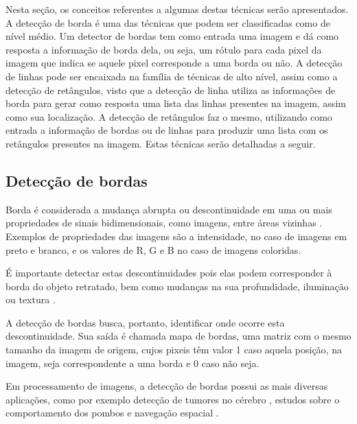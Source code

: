Nesta seção, os conceitos referentes a algumas destas técnicas serão apresentados. A detecção de borda é uma das técnicas que podem ser classificadas como de nível médio. Um detector de bordas tem como entrada uma imagem e dá como resposta a informação de borda dela, ou seja, um rótulo para cada pixel da imagem que indica se aquele pixel corresponde a uma borda ou não. A detecção de linhas pode ser encaixada na família de técnicas de alto nível, assim como a detecção de retângulos, visto que a detecção de linha utiliza as informações de borda para gerar como resposta uma lista das linhas presentes na imagem, assim como sua localização. A detecção de retângulos faz o mesmo, utilizando como entrada a informação de bordas ou de linhas para produzir uma lista com os retângulos presentes na imagem. Estas técnicas serão detalhadas a seguir.

\subsection{Detecção de bordas} \label{funt:procborda}



Borda é considerada a mudança abrupta ou descontinuidade em uma ou mais propriedades de sinais bidimensionais, como imagens, entre áreas vizinhas \cite{li2009markov}. Exemplos de propriedades das imagens são a intensidade, no caso de imagens em preto e branco, e os valores de R, G e B no caso de imagens coloridas.

É importante detectar estas descontinuidades pois elas podem corresponder à borda do objeto retratado, bem como mudanças na sua profundidade, iluminação ou textura \cite{descontinuidades}.


A detecção de bordas busca, portanto, identificar onde ocorre esta descontinuidade. Sua saída é chamada mapa de bordas, uma matriz com o mesmo tamanho da imagem de origem, cujos pixeis têm valor 1 caso aquela posição, na imagem, seja correspondente a uma borda e 0 caso não seja.

Em processamento de imagens, a detecção de bordas possui as mais diversas aplicações, como por exemplo detecção de tumores no cérebro \cite{detectumor}, estudos sobre o comportamento dos pombos \cite{pigeon} e navegação espacial \cite{navegespacial}.

